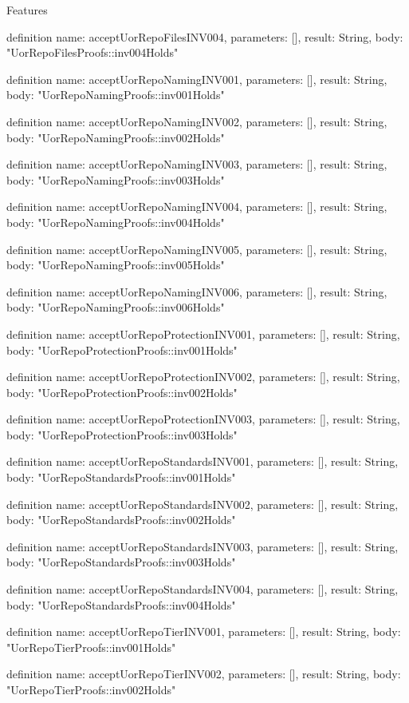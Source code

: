 \begin{lexlean}{Features}
\begin{semanticmodule}
definition{
  name: acceptUorRepoFilesINV004,
  parameters: [],
  result: String,
  body: "UorRepoFilesProofs::inv004Holds"
}

definition{
  name: acceptUorRepoNamingINV001,
  parameters: [],
  result: String,
  body: "UorRepoNamingProofs::inv001Holds"
}

definition{
  name: acceptUorRepoNamingINV002,
  parameters: [],
  result: String,
  body: "UorRepoNamingProofs::inv002Holds"
}

definition{
  name: acceptUorRepoNamingINV003,
  parameters: [],
  result: String,
  body: "UorRepoNamingProofs::inv003Holds"
}

definition{
  name: acceptUorRepoNamingINV004,
  parameters: [],
  result: String,
  body: "UorRepoNamingProofs::inv004Holds"
}

definition{
  name: acceptUorRepoNamingINV005,
  parameters: [],
  result: String,
  body: "UorRepoNamingProofs::inv005Holds"
}

definition{
  name: acceptUorRepoNamingINV006,
  parameters: [],
  result: String,
  body: "UorRepoNamingProofs::inv006Holds"
}

definition{
  name: acceptUorRepoProtectionINV001,
  parameters: [],
  result: String,
  body: "UorRepoProtectionProofs::inv001Holds"
}

definition{
  name: acceptUorRepoProtectionINV002,
  parameters: [],
  result: String,
  body: "UorRepoProtectionProofs::inv002Holds"
}

definition{
  name: acceptUorRepoProtectionINV003,
  parameters: [],
  result: String,
  body: "UorRepoProtectionProofs::inv003Holds"
}

definition{
  name: acceptUorRepoStandardsINV001,
  parameters: [],
  result: String,
  body: "UorRepoStandardsProofs::inv001Holds"
}

definition{
  name: acceptUorRepoStandardsINV002,
  parameters: [],
  result: String,
  body: "UorRepoStandardsProofs::inv002Holds"
}

definition{
  name: acceptUorRepoStandardsINV003,
  parameters: [],
  result: String,
  body: "UorRepoStandardsProofs::inv003Holds"
}

definition{
  name: acceptUorRepoStandardsINV004,
  parameters: [],
  result: String,
  body: "UorRepoStandardsProofs::inv004Holds"
}

definition{
  name: acceptUorRepoTierINV001,
  parameters: [],
  result: String,
  body: "UorRepoTierProofs::inv001Holds"
}

definition{
  name: acceptUorRepoTierINV002,
  parameters: [],
  result: String,
  body: "UorRepoTierProofs::inv002Holds"
}


\end{semanticmodule}
\end{lexlean}
